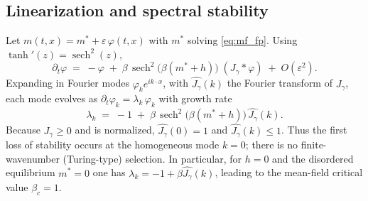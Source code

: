 \documentclass[11pt,a4paper]{article}
\begin{document}
\subsection{Linearization and spectral stability}
Let $m(t,x)=m^*+\varepsilon\,\varphi(t,x)$ with $m^*$ solving \eqref{eq:mf_fp}. Using $\tanh'(z)=\operatorname{sech}^2(z)$,
\[
\partial_t \varphi \;=\; -\varphi\; +\; \beta\,\operatorname{sech}^2\!\big(\beta(m^*+h)\big)\; (J_\gamma*\varphi)\; +\; O(\varepsilon^2).
\]
Expanding in Fourier modes $\varphi_k e^{i k\cdot x}$, with $\widehat{J_\gamma}(k)$ the Fourier transform of $J_\gamma$, each mode evolves as $\partial_t \varphi_k = \lambda_k\,\varphi_k$ with growth rate
\begin{equation}\label{eq:lin_rate}
 \lambda_k \;=\; -1\; +\; \beta\,\operatorname{sech}^2\!\big(\beta(m^*+h)\big)\,\widehat{J_\gamma}(k).
\end{equation}
Because $J_\gamma\ge0$ and is normalized, $\widehat{J_\gamma}(0)=1$ and $\widehat{J_\gamma}(k)\le1$. Thus the first loss of stability occurs at the homogeneous mode $k=0$; there is no finite-wavenumber (Turing-type) selection. In particular, for $h=0$ and the disordered equilibrium $m^*=0$ one has $\lambda_k = -1 + \beta\widehat{J_\gamma}(k)$, leading to the mean-field critical value $\beta_c=1$.
\end{document}
